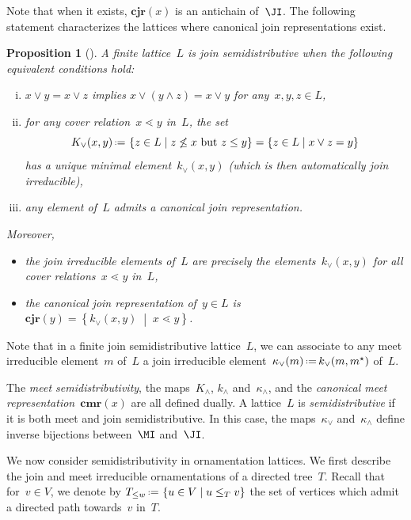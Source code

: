 \documentclass{amsart}
\newtheorem{proposition}[theorem]{Proposition}
\theoremstyle{definition}
\newcommand{\set}[2]{\left\{ #1 \;\middle|\; #2 \right\}} %
\newcommand{\eqdef}{\mbox{\,\raisebox{0.2ex}{\scriptsize\ensuremath{\mathrm:}}\ensuremath{=}\,}} %
\newcommand{\darkblue}{\color{darkblue}} %
\newcommand{\defn}[1]{\textsl{\darkblue #1}} %
\newcommand{\meet}{\wedge} %
\newcommand{\join}{\vee} %
\newcommand{\CJR}{\mathbf{cjr}} %
\newcommand{\CMR}{\mathbf{cmr}} %
\newcommand{\lessin}[2]{#1_{\le#2}} %
\begin{document}
Note that when it exists, $\CJR(x)$ is an antichain of~$\JI$.
The following statement characterizes the lattices where canonical join representations exist.

\begin{proposition}[{\cite[Thm.~2.24 \& Thm.~2.56]{FreeseNation}}]
\label{prop:semidistributive}
A finite lattice~$L$ is \defn{join semidistributive} when the following equivalent conditions hold:
\begin{enumerate}[(i)]
\item $x \join y = x \join z$ implies $x \join (y \meet z) = x \join y$ for any~$x, y, z \in L$,
\item for any cover relation~$x \lessdot y$ in~$L$, the set \[K_\join(x,y) \eqdef \set{z \in L}{z \not\le x \text{ but } z \le y} = \set{z \in L}{x \join z = y}\] has a unique minimal element~$k_\join(x,y)$ (which is then automatically join irreducible),
\item any element of~$L$ admits a canonical join representation.
\end{enumerate}
Moreover, 
\begin{itemize}
\item the join irreducible elements of~$L$ are precisely the elements~$k_\join(x,y)$ for all cover relations~$x \lessdot y$ in~$L$,
\item the canonical join representation of~$y \in L$ is~$\CJR(y) = \set{k_\join(x, y)}{x \lessdot y}$.
\end{itemize}
\end{proposition}

Note that in a finite join semidistributive lattice~$L$, we can associate to any meet irreducible element~$m$ of~$L$ a join irreducible element~$\kappa_\join(m) \eqdef k_\join(m, m^\star)$ of~$L$.

The \defn{meet semidistributivity}, the maps~$K_\meet$, $k_\meet$ and~$\kappa_\meet$, and the \defn{canonical meet representation}~$\CMR(x)$ are all defined dually.
A lattice~$L$ is \defn{semidistributive} if it is both meet and join semidistributive.
In this case, the maps~$\kappa_\join$ and~$\kappa_\meet$ define inverse bijections between~$\MI$ and~$\JI$.

\medskip
We now consider semidistributivity in ornamentation lattices.
We first describe the join and meet irreducible ornamentations of a directed tree~$T$.
Recall that for~$v \in V$, we denote by $\lessin{T}{w} \eqdef \set{u \in V}{u \le_T v}$ the set of vertices which admit a directed path towards~$v$ in~$T$.
\end{document}
